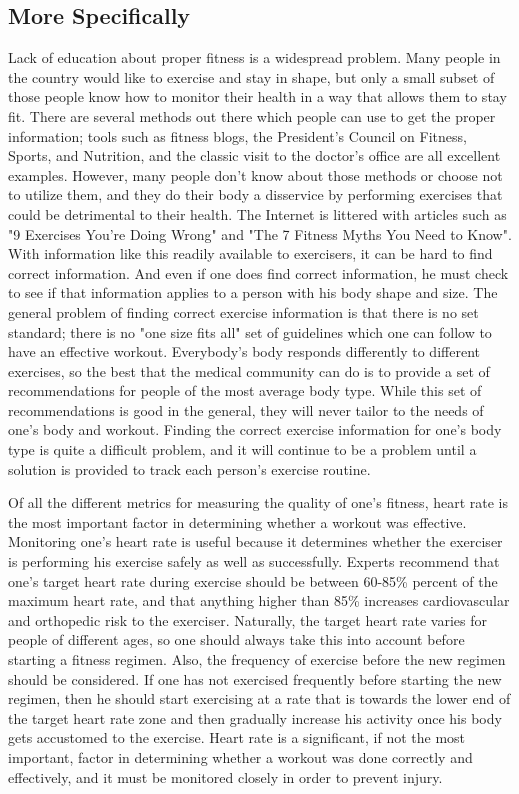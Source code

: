 \documentclass[letterpaper,english]{scrreprt}
\begin{document}
\subsection{More Specifically}
Lack of education about proper fitness is a widespread problem. Many people in the country would like to exercise and stay in shape, but only a small subset of those people know how to monitor their health in a way that allows them to stay fit. There are several methods out there which people can use to get the proper information; tools such as fitness blogs, the President's Council on Fitness, Sports, and Nutrition, and the classic visit to the doctor's office are all excellent examples. However, many people don't know about those methods or choose not to utilize them, and they do their body a disservice by performing exercises that could be detrimental to their health. The Internet is littered with articles such as "9 Exercises You're Doing Wrong" and "The 7 Fitness Myths You Need to Know". With information like this readily available to exercisers, it can be hard to find correct information. And even if one does find correct information, he must check to see if that information applies to a person with his body shape and size. The general problem of finding correct exercise information is that there is no set standard; there is no "one size fits all" set of guidelines which one can follow to have an effective workout. Everybody's body responds differently to different exercises, so the best that the medical community can do is to provide a set of recommendations for people of the most average body type. While this set of recommendations is good in the general, they will never tailor to the needs of one's body and workout. Finding the correct exercise information for one's body type is quite a difficult problem, and it will continue to be a problem until a solution is provided to track each person's exercise routine.
 
Of all the different metrics for measuring the quality of one's fitness, heart rate is the most important factor in determining whether a workout was effective. Monitoring one's heart rate is useful because it determines whether the exerciser is performing his exercise safely as well as successfully. Experts recommend that one's target heart rate during exercise should be between 60-85\% percent of the maximum heart rate, and that anything higher than 85\% increases cardiovascular and orthopedic risk to the exerciser. Naturally, the target heart rate varies for people of different ages, so one should always take this into account before starting a fitness regimen. Also, the frequency of exercise before the new regimen should be considered. If one has not exercised frequently before starting the new regimen, then he should start exercising at a rate that is towards the lower end of the target heart rate zone and then gradually increase his activity once his body gets accustomed to the exercise. Heart rate is a significant, if not the most important, factor in determining whether a workout was done correctly and effectively, and it must be monitored closely in order to prevent injury.
 
\end{document}
